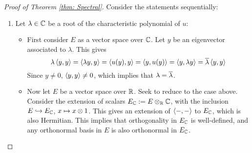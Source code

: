 \documentclass{article}
\begin{document}
\begin{proof}[Proof of Theorem \ref{thm: Spectral}]
    Consider the statements sequentially:
    \begin{enumerate}[label=\roman*)]
        \item Let $\lambda \in \mathbb{C}$ be a root of the characteristic polynomial of $u$:
        \begin{itemize}
            \item First consider $E$ as a vector space over $\mathbb{C}$. Let $y$ be an eigenvector associated to $\lambda$. This gives
            \[
                \lambda \left\langle y, y \right\rangle = \left\langle \lambda y, y \right\rangle = \left\langle u(y), y \right\rangle = \left\langle y, u(y) \right\rangle = \left\langle y, \lambda y \right\rangle = \overline{\lambda} \left\langle y, y \right\rangle
            \]
            Since $y \neq 0$, $\left\langle y, y \right\rangle \neq 0$, which implies that $\lambda = \overline{\lambda}$.
            \item Now let $E$ be a vector space over $\mathbb{R}$. Seek to reduce to the case above. Consider the extension of scalars $E_{\mathbb{C}} := E \otimes_{\mathbb{R}} \mathbb{C}$, with the inclusion $E \hookrightarrow E_{\mathbb{C}}$, $x \mapsto x \otimes 1$. This gives an extension of $\left\langle -, - \right\rangle$ to $E_{\mathbb{C}}$, which is also Hermitian. This implies that orthogonality in $E_{\mathbb{C}}$ is well-defined, and any orthonormal basis in $E$ is also orthonormal in $E_{\mathbb{C}}$.
            

\end{itemize}
\end{enumerate}
\end{proof}
\end{document}
